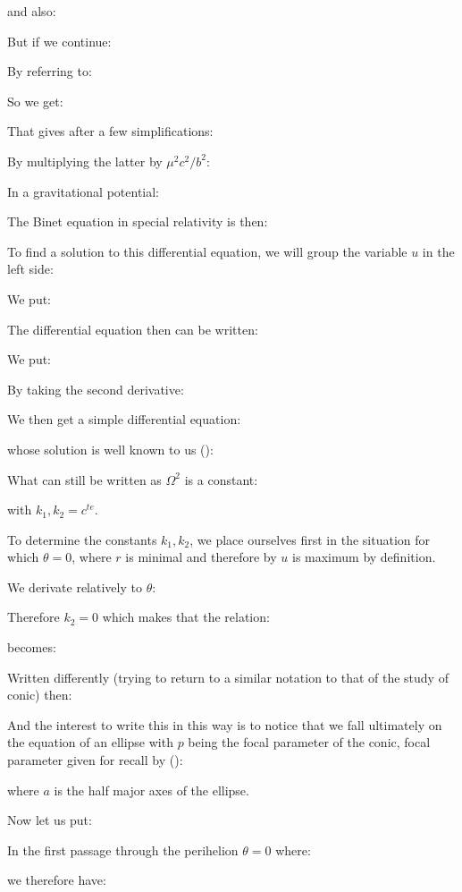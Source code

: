 	and also:
	
	But if we continue:
	
	By referring to:
	
	So we get:
	
	That gives after a few simplifications:
		
	By multiplying the latter by $\mu^2c^2/b^2$:
	
	In a gravitational potential:
	
	The Binet equation in special relativity is then:
	
	To find a solution to this differential equation, we will group the variable $u$ in the left side:
	
	We put:
	
	The differential equation then can be written:
	
	We put:
	
	By taking the second derivative:
	
	We then get a simple differential equation:
	
	whose solution is well known to us ():
	
	What can still be written as $\Omega^2$ is a constant:
	
	with $k_1,k_2=c^{te}$.

	To determine the constants $k_1,k_2$, we place ourselves first in the situation for which $\theta=0$, where $r$ is minimal and therefore by $u$ is maximum by definition.
	
	We derivate relatively to $\theta$:
	
	Therefore $k_2=0$ which makes that the relation:
	
	becomes:
	
	Written differently (trying to return to a similar notation to that of the study of conic) then:
	
	And the interest to write this in this way is to notice that we fall ultimately on the equation of an ellipse with $p$ being the focal parameter of the conic, focal parameter given for recall by ():
	
	where $a$ is the half major axes of the ellipse.
	
	Now let us put:
	
	In the first passage through the perihelion $\theta=0$ where:
	
	we therefore have:
	
